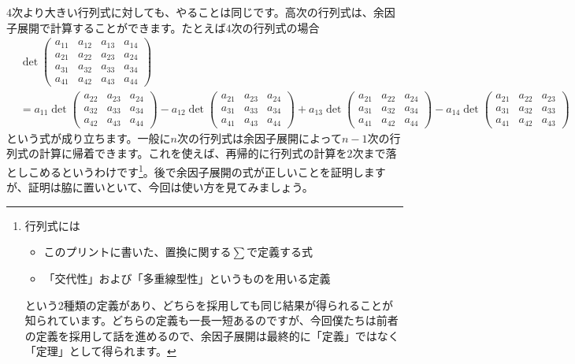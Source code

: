 $4$次より大きい行列式に対しても、やることは同じです。高次の行列式は、余因子展開で計算することができます。たとえば$4$次の行列式の場合
\begin{align*}
&\det
\begin{pmatrix}
a_{11} & a_{12} & a_{13} & a_{14} \\
a_{21} & a_{22} & a_{23} & a_{24} \\
a_{31} & a_{32} & a_{33} & a_{34} \\
a_{41} & a_{42} & a_{43} & a_{44}
\end{pmatrix} \\
&= a_{11} \det
\begin{pmatrix}
a_{22} & a_{23} & a_{24} \\
a_{32} & a_{33} & a_{34} \\
a_{42} & a_{43} & a_{44}
\end{pmatrix}
- a_{12} \det
\begin{pmatrix}
a_{21} & a_{23} & a_{24} \\
a_{31} & a_{33} & a_{34} \\
a_{41} & a_{43} & a_{44}
\end{pmatrix}
+ a_{13} \det
\begin{pmatrix}
a_{21} & a_{22} & a_{24} \\
a_{31} & a_{32} & a_{34} \\
a_{41} & a_{42} & a_{44}
\end{pmatrix}
- a_{14} \det
\begin{pmatrix}
a_{21} & a_{22} & a_{23} \\
a_{31} & a_{32} & a_{33} \\
a_{41} & a_{42} & a_{43}
\end{pmatrix}
\end{align*}
という式が成り立ちます。一般に$n$次の行列式は余因子展開によって$n - 1$次の行列式の計算に帰着できます。これを使えば、再帰的に行列式の計算を$2$次まで落としこめるというわけです\footnote{行列式には
\begin{itemize}
\item このプリントに書いた、置換に関する$\sum$で定義する式
\item 「交代性」および「多重線型性」というものを用いる定義
\end{itemize}
という$2$種類の定義があり、どちらを採用しても同じ結果が得られることが知られています。どちらの定義も一長一短あるのですが、今回僕たちは前者の定義を採用して話を進めるので、余因子展開は最終的に「定義」ではなく「定理」として得られます。}。後で余因子展開の式が正しいことを証明しますが、証明は脇に置いといて、今回は使い方を見てみましょう。


